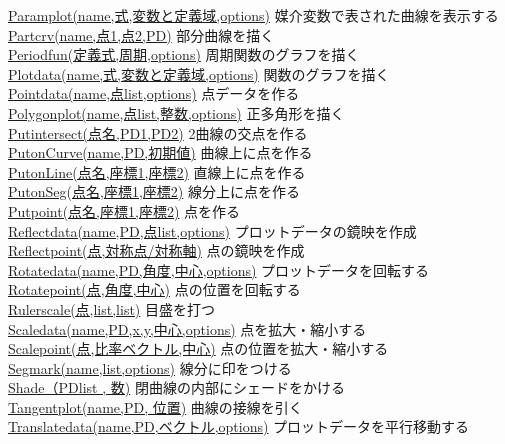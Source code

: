 \documentclass[papersize,a4paper,12pt,uplatex]{jsarticle}
\begin{document}
\begin{tabbing}
\hyperlink{paramplot}{Paramplot(name,式,変数と定義域,options)}  \>媒介変数で表された曲線を表示する\\
\hyperlink{partcrv}{Partcrv(name,点1,点2,PD)}    \>部分曲線を描く\\
\hyperlink{periodfun}{Periodfun(定義式,周期,options)}    \>周期関数のグラフを描く\\
\hyperlink{plotdata}{Plotdata(name,式,変数と定義域,options)}    \>関数のグラフを描く\\
\hyperlink{pointdata}{Pointdata(name,点list,options)}  \>点データを作る\\
\hyperlink{polygonplot}{Polygonplot(name,点list,整数,options)}  \>正多角形を描く\\
\hyperlink{putintersect}{Putintersect(点名,PD1,PD2)}  \>2曲線の交点を作る\\
\hyperlink{putoncurve}{PutonCurve(name,PD,初期値)}  \>曲線上に点を作る\\
\hyperlink{putonline}{PutonLine(点名,座標1,座標2)}      \>直線上に点を作る\\
\hyperlink{putonseg}{PutonSeg(点名,座標1,座標2)}      \>線分上に点を作る\\
\hyperlink{putpoint}{Putpoint(点名,座標1,座標2)}      \>点を作る\\
\hyperlink{reflectdata}{Reflectdata(name,PD,点list,options)}  \>プロットデータの鏡映を作成\\
\hyperlink{reflectpoint}{Reflectpoint(点,対称点/対称軸)}  \>点の鏡映を作成\\
\hyperlink{rotatedata}{Rotatedata(name,PD,角度,中心,options)}  \>プロットデータを回転する\\
\hyperlink{rotatepoint}{Rotatepoint(点,角度,中心)}  \>点の位置を回転する\\
\hyperlink{rulerscale}{Rulerscale(点,list,list)}  \>目盛を打つ\\
\hyperlink{scaledata}{Scaledata(name,PD,x,y,中心,options)}   \>点を拡大・縮小する\\
\hyperlink{scalepoint}{Scalepoint(点,比率ベクトル,中心)}   \>点の位置を拡大・縮小する\\
\hyperlink{drawsegmark}{Segmark(name,list,options)}  \>線分に印をつける\\
\hyperlink{shade}{Shade（PDlist , 数)}      \>閉曲線の内部にシェードをかける\\
\hyperlink{tangentplot}{Tangentplot(name,PD, 位置)}      \>曲線の接線を引く\\
\hyperlink{translatedata}{Translatedata(name,PD,ベクトル,options)}  \>プロットデータを平行移動する\\

\end{tabbing}
\end{document}
